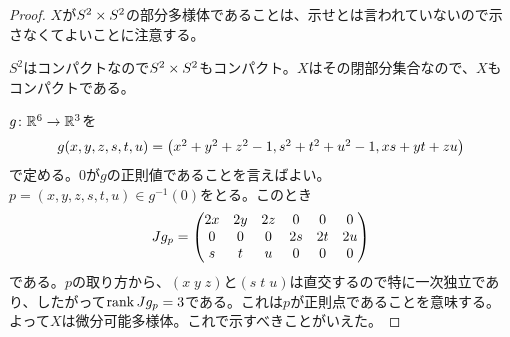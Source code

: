 \subsubsection{}%
\begin{proof}
  $X$が$S^2 \times S^2$の部分多様体であることは、示せとは言われていないので示さなくてよいことに注意する。

$S^2$はコンパクトなので$S^2 \times S^2$もコンパクト。$X$はその閉部分集合なので、$X$もコンパクトである。

  $g \colon {\mathbb R}^6 \to {\mathbb R}^3$を
  \[
  g(x,y,z,s,t,u) = \begin{pmatrix} x^2 + y^2 + z^2 -1, s^2 + t^2 + u^2 -1 , xs + yt + zu \end{pmatrix}
  \]
  で定める。$0$が$g$の正則値であることを言えばよい。$p=(x,y,z,s,t,u) \in g^{-1}(0)$をとる。このとき
  \[
  Jg_p = \begin{pmatrix} 2x & 2y & 2z & 0 &0& 0\\ 0 &0 &0& 2s& 2t& 2u\\ s &t &u &0& 0& 0   \end{pmatrix}
  \]
  である。$p$の取り方から、$(x \;  y \;  z)$と$(s \; t \; u)$は直交するので特に一次独立であり、したがって$\operatorname{rank} Jg_p = 3$である。これは$p$が正則点であることを意味する。よって$X$は微分可能多様体。これで示すべきことがいえた。
\end{proof}

\newpage


